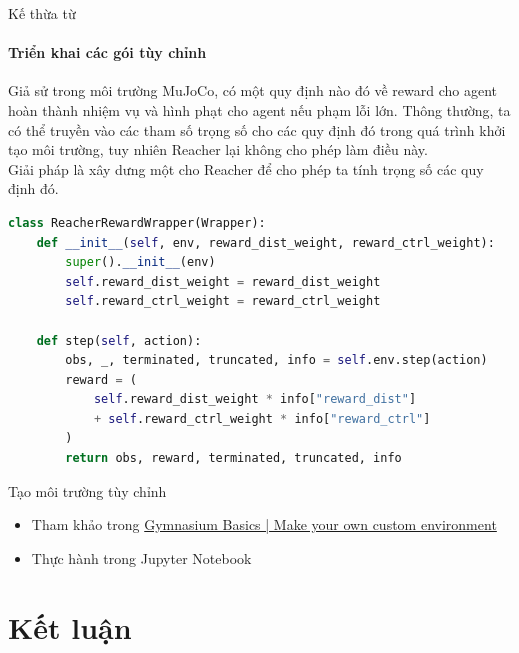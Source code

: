 \documentclass[10pt,aspectratio=169]{beamer}
\begin{document}
\begin{frame}[fragile]{Kế thừa từ }
\framesubtitle{Triển khai các gói tùy chỉnh}
\footnotesize
Giả sử trong môi trường MuJoCo\footnotemark, có một quy định nào đó về reward cho agent hoàn thành nhiệm vụ và hình phạt cho agent nếu phạm lỗi lớn. Thông thường, ta có thể truyền vào các tham số trọng số cho các quy định đó trong quá trình khởi tạo môi trường, tuy nhiên Reacher\footnotemark \hspace{1pt} lại không cho phép làm điều này.\\
\vspace{4pt}
Giải pháp là xây dưng một  cho Reacher để cho phép ta tính trọng số các quy định đó.\\
\vspace{8pt}
\scriptsize
\begin{lstlisting}[language=Python]
class ReacherRewardWrapper(Wrapper):
    def __init__(self, env, reward_dist_weight, reward_ctrl_weight):
        super().__init__(env)
        self.reward_dist_weight = reward_dist_weight
        self.reward_ctrl_weight = reward_ctrl_weight

    def step(self, action):
        obs, _, terminated, truncated, info = self.env.step(action)
        reward = (
            self.reward_dist_weight * info["reward_dist"]
            + self.reward_ctrl_weight * info["reward_ctrl"]
        )
        return obs, reward, terminated, truncated, info
\end{lstlisting}
\end{frame}

\begin{frame}[fragile]{Tạo môi trường tùy chỉnh}{\subsecname}
\begin{itemize}
\setlength\itemsep{8pt}
\item Tham khảo trong \href{https://gymnasium.farama.org/tutorials/gymnasium_basics/environment_creation/#sphx-glr-tutorials-gymnasium-basics-environment-creation-py}{Gymnasium Basics | Make your own custom environment}
\item Thực hành trong Jupyter Notebook
\end{itemize}
\end{frame}

\section{Kết luận}
\end{document}
